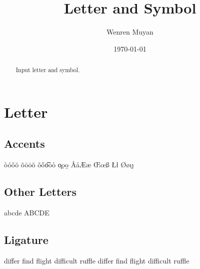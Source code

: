 \documentclass{article}
\title{Letter and Symbol}
\author{Wenren Muyan}
\date{\today}
\begin{document}
    \maketitle

        \begin{abstract}
        Input letter and symbol. 
    \end{abstract}

    \tableofcontents

    \section{Letter}
        \subsection{Accents}
            \`o\phantom{50}\'o\phantom{50}\^o\phantom{50}\"o\newline
            \~o\phantom{50}\=o\phantom{50}\.o\phantom{50}\u{o}\newline
            \v{o}\phantom{50}\H{o}\phantom{50}\t{oo}\phantom{50}\r{o}\newline
            \c{o}\phantom{50}\d{o}\phantom{50}\b{o}\newline
            \AA\phantom{50}\aa\phantom{50}\AE\phantom{50}\ae\newline
            \OE\phantom{50}\oe\phantom{50}\SS\phantom{50}\ss\newline
            \IJ\phantom{50}\ij\phantom{50}\L\phantom{50}\l\newline
            \O\phantom{50}\o\phantom{50}\i\phantom{50}\j

        \subsection{Other Letters}
            \textgreek{abcde}\newline
            {\selectfont ABCDE}

        \subsection{Ligature}
            differ find flight difficult ruffle\newline
            dif{}fer f{}ind f\/light dif\/f\/icult ruffle
\end{document}
